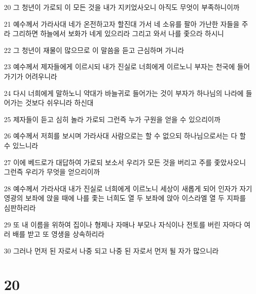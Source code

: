 \par 20 그 청년이 가로되 이 모든 것을 내가 지키었사오니 아직도 무엇이 부족하니이까
\par 21 예수께서 가라사대 네가 온전하고자 할진대 가서 네 소유를 팔아 가난한 자들을 주라 그리하면 하늘에서 보화가 네게 있으리라 그리고 와서 나를 좇으라 하시니
\par 22 그 청년이 재물이 많으므로 이 말씀을 듣고 근심하며 가니라
\par 23 예수께서 제자들에게 이르시되 내가 진실로 너희에게 이르노니 부자는 천국에 들어가기가 어려우니라
\par 24 다시 너희에게 말하노니 약대가 바늘귀로 들어가는 것이 부자가 하나님의 나라에 들어가는 것보다 쉬우니라 하신대
\par 25 제자들이 듣고 심히 놀라 가로되 그런즉 누가 구원을 얻을 수 있으리이까
\par 26 예수께서 저희를 보시며 가라사대 사람으로는 할 수 없으되 하나님으로서는 다 할 수 있느니라
\par 27 이에 베드로가 대답하여 가로되 보소서 우리가 모든 것을 버리고 주를 좇았사오니 그런즉 우리가 무엇을 얻으리이까
\par 28 예수께서 가라사대 내가 진실로 너희에게 이르노니 세상이 새롭게 되어 인자가 자기 영광의 보좌에 앉을 때에 나를 좇는 너희도 열 두 보좌에 앉아 이스라엘 열 두 지파를 심판하리라
\par 29 또 내 이름을 위하여 집이나 형제나 자매나 부모나 자식이나 전토를 버린 자마다 여러 배를 받고 또 영생을 상속하리라
\par 30 그러나 먼저 된 자로서 나중 되고 나중 된 자로서 먼저 될 자가 많으니라

\chapter{20}

